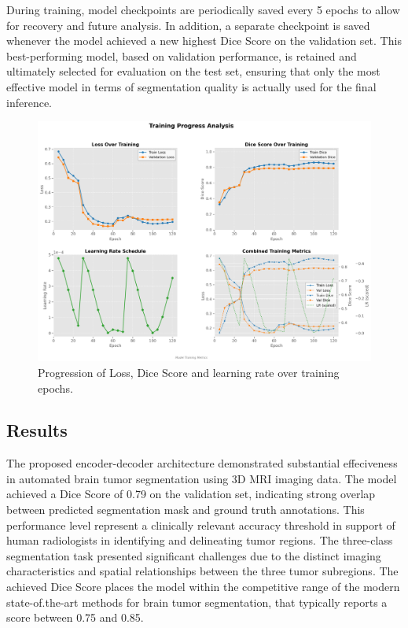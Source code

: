 \documentclass[10pt,twocolumn,letterpaper]{article}
\begin{document}
During training, model checkpoints are periodically saved every 5 epochs to allow for recovery and future analysis. In addition, a separate checkpoint is saved whenever the model achieved a new highest Dice Score on the validation set. This best-performing model, based on validation performance, is retained and ultimately selected for evaluation on the test set, ensuring that only the most effective model in terms of segmentation quality is actually used for the final inference.

\begin{figure}[H]
    \centering
    \includegraphics[width=\linewidth]{img/training4mb.png}
    \caption{Progression of Loss, Dice Score and learning rate over training epochs.}
\end{figure}

\subsection{Results}
The proposed encoder-decoder architecture demonstrated substantial effeciveness in automated brain tumor segmentation using 3D MRI imaging data. The model achieved a Dice Score of 0.79 on the validation set, indicating strong overlap between predicted segmentation mask and ground truth annotations. This performance level represent a clinically relevant accuracy threshold in support of human radiologists in identifying and delineating tumor regions.
The three-class segmentation task presented significant challenges due to the distinct imaging characteristics and spatial relationships between the three tumor subregions.
The achieved Dice Score places the model within the competitive range of the modern state-of.the-art methods for brain tumor segmentation, that typically reports a score between 0.75 and 0.85.
\end{document}
